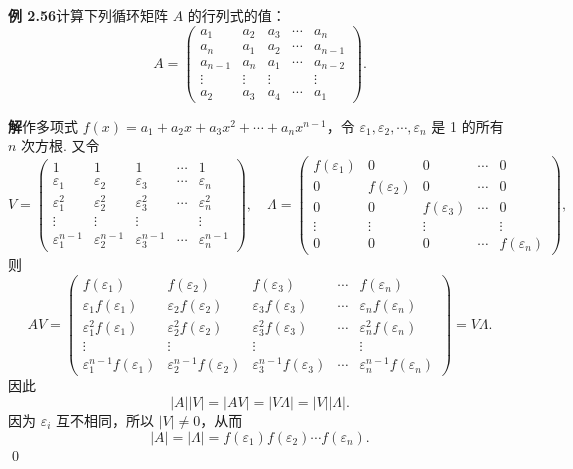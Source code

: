 \documentclass[UTF8, 12pt, fontset=fandol, oneside]{ctexart}
\begin{document}
\noindent\textbf{例 2.56}\quad 计算下列循环矩阵 $A$ 的行列式的值：
\[
A=
\left(
\begin{array}{ccccc}
a_1 & a_2 & a_3 & \cdots & a_n\\
a_n & a_1 & a_2 & \cdots & a_{n-1}\\
a_{n-1} & a_n & a_1 & \cdots & a_{n-2}\\
\vdots & \vdots & \vdots & & \vdots\\
a_2 & a_3 & a_4 & \cdots & a_1
\end{array}
\right).
\]

\noindent\textbf{解}\quad 作多项式 $f(x)=a_1+a_2x+a_3x^2+\cdots+a_nx^{n-1}$，令 $\varepsilon_1,\varepsilon_2,\cdots,\varepsilon_n$ 是 1 的所有 $n$ 次方根. 又令
\[
V=
\left(
\begin{array}{ccccc}
1 & 1 & 1 & \cdots & 1\\
\varepsilon_1 & \varepsilon_2 & \varepsilon_3 & \cdots & \varepsilon_n\\
\varepsilon_1^2 & \varepsilon_2^2 & \varepsilon_3^2 & \cdots & \varepsilon_n^2\\
\vdots & \vdots & \vdots & & \vdots\\
\varepsilon_1^{n-1} & \varepsilon_2^{n-1} & \varepsilon_3^{n-1} & \cdots & \varepsilon_n^{n-1}
\end{array}
\right),\quad
\Lambda=
\left(
\begin{array}{ccccc}
f(\varepsilon_1) & 0 & 0 & \cdots & 0\\
0 & f(\varepsilon_2) & 0 & \cdots & 0\\
0 & 0 & f(\varepsilon_3) & \cdots & 0\\
\vdots & \vdots & \vdots & & \vdots\\
0 & 0 & 0 & \cdots & f(\varepsilon_n)
\end{array}
\right),
\]
则
\[
AV=
\left(
\begin{array}{ccccc}
f(\varepsilon_1) & f(\varepsilon_2) & f(\varepsilon_3) & \cdots & f(\varepsilon_n)\\
\varepsilon_1f(\varepsilon_1) & \varepsilon_2f(\varepsilon_2) & \varepsilon_3f(\varepsilon_3) & \cdots & \varepsilon_nf(\varepsilon_n)\\
\varepsilon_1^2f(\varepsilon_1) & \varepsilon_2^2f(\varepsilon_2) & \varepsilon_3^2f(\varepsilon_3) & \cdots & \varepsilon_n^2f(\varepsilon_n)\\
\vdots & \vdots & \vdots & & \vdots\\
\varepsilon_1^{n-1}f(\varepsilon_1) & \varepsilon_2^{n-1}f(\varepsilon_2) & \varepsilon_3^{n-1}f(\varepsilon_3) & \cdots & \varepsilon_n^{n-1}f(\varepsilon_n)
\end{array}
\right)
=V\Lambda.
\]
因此
\[
|A||V|=|AV|=|V\Lambda|=|V||\Lambda|.
\]
因为 $\varepsilon_i$ 互不相同，所以 $|V|\ne0$，从而
\[
|A|=|\Lambda|=f(\varepsilon_1)f(\varepsilon_2)\cdots f(\varepsilon_n).
\]
\qed
\end{document}
